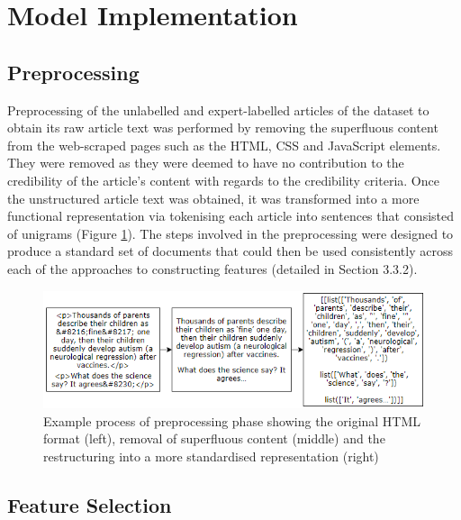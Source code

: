 \documentclass[a4paper,twoside,phd]{BYUPhys}
\begin{document}
\section{Model Implementation}
\label{sec:SystemModel}

\subsection{Preprocessing}
\label{sec:ModelPreprocessing}

Preprocessing of the unlabelled and expert-labelled articles of the dataset to obtain its raw article text was performed by removing the superfluous content from the web-scraped pages such as the HTML, CSS and JavaScript elements. They were removed as they were deemed to have no contribution to the credibility of the article's content with regards to the credibility criteria. Once the unstructured article text was obtained, it was transformed into a more functional representation via tokenising each article into sentences that consisted of unigrams (Figure \ref{fig:PreprocessingExample}). The steps involved in the preprocessing were designed to produce a standard set of documents that could then be used consistently across each of the approaches to constructing features (detailed in Section 3.3.2).

\begin{figure}[H]

	\includegraphics[width=16cm]{images/Preprocessing-example.png}
	\caption{Example process of preprocessing phase showing the original HTML format (left), removal of superfluous content (middle) and the restructuring into a more standardised representation (right)}
	\label{fig:PreprocessingExample}
\end{figure}

\subsection{Feature Selection}
\label{sec:ModelFeatureSelection}
\end{document}
